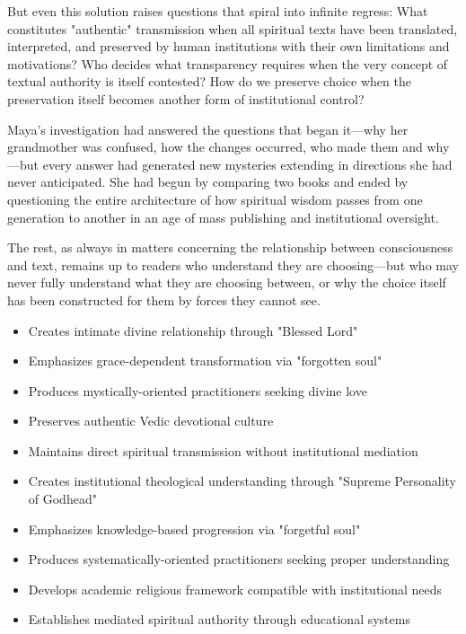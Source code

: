 \documentclass[12pt,twoside]{book}
\begin{document}
But even this solution raises questions that spiral into infinite regress: What constitutes "authentic" transmission when all spiritual texts have been translated, interpreted, and preserved by human institutions with their own limitations and motivations? Who decides what transparency requires when the very concept of textual authority is itself contested? How do we preserve choice when the preservation itself becomes another form of institutional control?

Maya's investigation had answered the questions that began it—why her grandmother was confused, how the changes occurred, who made them and why—but every answer had generated new mysteries extending in directions she had never anticipated. She had begun by comparing two books and ended by questioning the entire architecture of how spiritual wisdom passes from one generation to another in an age of mass publishing and institutional oversight.

The rest, as always in matters concerning the relationship between consciousness and text, remains up to readers who understand they are choosing—but who may never fully understand what they are choosing between, or why the choice itself has been constructed for them by forces they cannot see.

\begin{itemize}
\item Creates intimate divine relationship through "Blessed Lord"
\item Emphasizes grace-dependent transformation via "forgotten soul"
\item Produces mystically-oriented practitioners seeking divine love
\item Preserves authentic Vedic devotional culture
\item Maintains direct spiritual transmission without institutional mediation

\item Creates institutional theological understanding through "Supreme Personality of Godhead"
\item Emphasizes knowledge-based progression via "forgetful soul"
\item Produces systematically-oriented practitioners seeking proper understanding
\item Develops academic religious framework compatible with institutional needs
\item Establishes mediated spiritual authority through educational systems
\end{itemize}
\end{document}
